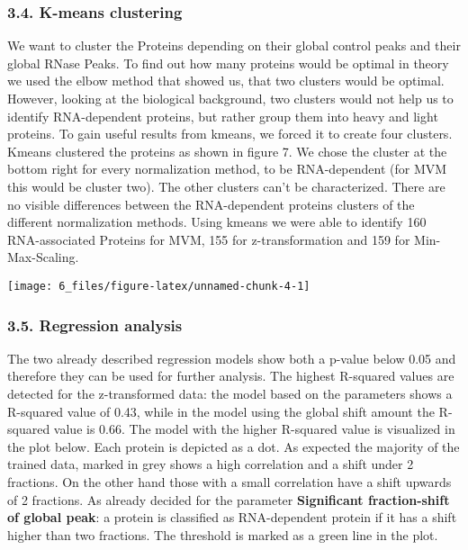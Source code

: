 \documentclass[
  12pt,
]{article}
\begin{document}
\hypertarget{k-means-clustering-1}{%
\subsubsection{3.4. K-means clustering}\label{k-means-clustering-1}}

We want to cluster the Proteins depending on their global control peaks
and their global RNase Peaks. To find out how many proteins would be
optimal in theory we used the elbow method that showed us, that two
clusters would be optimal. However, looking at the biological
background, two clusters would not help us to identify RNA-dependent
proteins, but rather group them into heavy and light proteins. To gain
useful results from kmeans, we forced it to create four clusters. Kmeans
clustered the proteins as shown in figure 7. We chose the cluster at the
bottom right for every normalization method, to be RNA-dependent (for
MVM this would be cluster two). The other clusters can't be
characterized. There are no visible differences between the
RNA-dependent proteins clusters of the different normalization methods.
Using kmeans we were able to identify 160 RNA-associated Proteins for
MVM, 155 for z-transformation and 159 for Min-Max-Scaling.

\texttt{[image: 6\_files/figure-latex/unnamed-chunk-4-1]}

\hypertarget{regression-analysis-1}{%
\subsubsection{3.5. Regression analysis}\label{regression-analysis-1}}

The two already described regression models show both a p-value below
0.05 and therefore they can be used for further analysis. The highest
R-squared values are detected for the z-transformed data: the model
based on the parameters shows a R-squared value of 0.43, while in the
model using the global shift amount the R-squared value is 0.66. The
model with the higher R-squared value is visualized in the plot below.
Each protein is depicted as a dot. As expected the majority of the
trained data, marked in grey shows a high correlation and a shift under
2 fractions. On the other hand those with a small correlation have a
shift upwards of 2 fractions. As already decided for the parameter
\textbf{Significant fraction-shift of global peak}: a protein is
classified as RNA-dependent protein if it has a shift higher than two
fractions. The threshold is marked as a green line in the plot.
\end{document}
